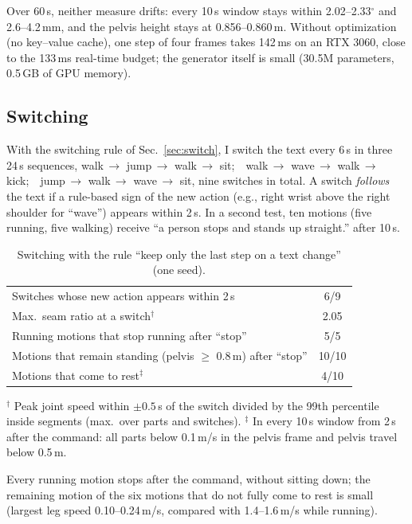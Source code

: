 \documentclass[11pt]{article}
\begin{document}
Over 60\,s, neither measure drifts: every 10\,s window stays within 2.02--2.33$^\circ$ and
2.6--4.2\,mm, and the pelvis height stays at 0.856--0.860\,m.
Without optimization (no key--value cache), one step of four frames takes 142\,ms on an RTX 3060, close to
the 133\,ms real-time budget; the generator itself is small (30.5M parameters, 0.5\,GB of GPU memory).

\subsection{Switching}
With the switching rule of Sec.~\ref{sec:switch}, I switch the text every 6\,s in three 24\,s sequences,
walk\,$\to$ jump\,$\to$ walk\,$\to$ sit;\ \ walk\,$\to$ wave\,$\to$ walk\,$\to$ kick;\ \
jump\,$\to$ walk\,$\to$ wave\,$\to$ sit,
nine switches in total.
A switch \emph{follows} the text if a rule-based sign of the new action
(e.g., right wrist above the right shoulder for ``wave'') appears within 2\,s.
In a second test, ten motions (five running, five walking) receive
``a person stops and stands up straight.'' after 10\,s.

\begin{table}[h]
\centering
\caption{Switching with the rule ``keep only the last step on a text change'' (one seed).}
\label{tab:switch}
\begin{tabular}{lc}
\toprule
Switches whose new action appears within 2\,s & 6/9\\
Max.\ seam ratio at a switch$^\dagger$ & 2.05\\
\midrule
Running motions that stop running after ``stop'' & 5/5\\
Motions that remain standing (pelvis $\geq$ 0.8\,m) after ``stop'' & 10/10\\
Motions that come to rest$^\ddagger$ & 4/10\\
\bottomrule
\end{tabular}

\vspace{2pt}
{\footnotesize $^\dagger$ Peak joint speed within $\pm0.5$\,s of the switch divided by the 99th percentile
inside segments (max.\ over parts and switches).
$^\ddagger$ In every 10\,s window from 2\,s after the command: all parts below 0.1\,m/s in the pelvis
frame and pelvis travel below 0.5\,m.}
\end{table}

Every running motion stops after the command, without sitting down; the remaining motion of the six
motions that do not fully come to rest is small (largest leg speed 0.10--0.24\,m/s, compared with
1.4--1.6\,m/s while running).
\end{document}
